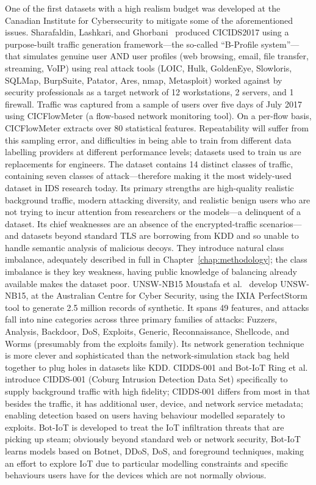 One of the first datasets with a high realism budget was developed at the Canadian Institute for Cybersecurity to mitigate some of the aforementioned issues. Sharafaldin, Lashkari, and Ghorbani~\cite{sharafaldin2018cicids} produced CICIDS2017 using a purpose-built traffic generation framework---the so-called “B-Profile system”---that simulates genuine user AND user profiles (web browsing, email, file transfer, streaming, VoIP) using real attack tools (LOIC, Hulk, GoldenEye, Slowloris, SQLMap, BurpSuite, Patator, Ares, nmap, Metasploit) worked against by security professionals as a target network of 12 workstations, 2 servers, and 1 firewall. Traffic was captured from a sample of users over five days of July 2017 using CICFlowMeter (a flow-based network monitoring tool). On a per-flow basis, CICFlowMeter extracts over 80 statistical features. Repeatability will suffer from this sampling error, and difficulties in being able to train from different data labelling providers at different performance levels; datasets used to train us are replacements for engineers. The dataset contains 14 distinct classes of traffic, containing seven classes of attack—therefore making it the most widely-used dataset in IDS research today. Its primary strengths are high-quality realistic background traffic, modern attacking diversity, and realistic benign users who are not trying to incur attention from researchers or the models—a delinquent of a dataset. Its chief weaknesses are an absence of the encrypted-traffic scenarios—and datasets beyond standard TLS are borrowing from KDD and so unable to handle semantic analysis of malicious decoys. They introduce natural class imbalance, adequately described in full in Chapter~\ref{chap:methodology}; the class imbalance is they key weakness, having public knowledge of balancing already available makes the dataset poor.
UNSW-NB15
Moustafa et al.~\cite{moustafa2015unswnb15} develop UNSW-NB15, at the Australian Centre for Cyber Security, using the IXIA PerfectStorm tool to generate 2.5 million records of synthetic. It spans 49 features, and attacks fall into nine categories across three primary families of attacks: Fuzzers, Analysis, Backdoor, DoS, Exploits, Generic, Reconnaissance, Shellcode, and Worms (presumably from the exploits family). Its network generation technique is more clever and sophisticated than the network-simulation stack bag held together to plug holes in datasets like KDD.
CIDDS-001 and Bot-IoT
Ring et al.~\cite{ring2019survey} introduce CIDDS-001 (Coburg Intrusion Detection Data Set) specifically to supply background traffic with high fidelity; CIDDS-001 differs from most in that besides the traffic, it has additional user, device, and network service metadata; enabling detection based on users having behaviour modelled separately to exploits.
Bot-IoT is developed to treat the IoT infiltration threats that are picking up steam; obviously beyond standard web or network security, Bot-IoT learns models based on Botnet, DDoS, DoS, and foreground techniques, making an effort to explore IoT due to particular modelling constraints and specific behaviours users have for the devices which are not normally obvious.

